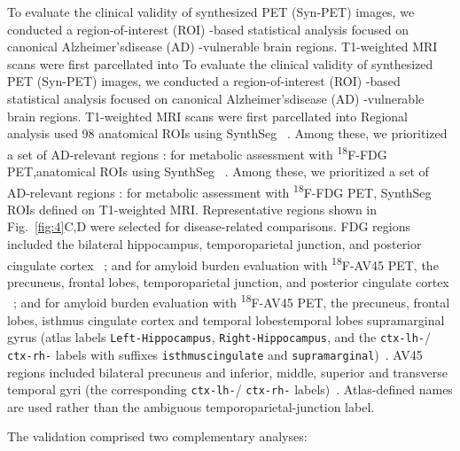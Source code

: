 \documentclass{article}
\providecommand{\DIFaddtex}[1]{{\protect\color{blue} \sf #1}} %
\providecommand{\DIFdeltex}[1]{{\protect\color{red} \ifmmode #1\else\scriptsize #1\fi}} %
\providecommand{\DIFaddbegin}{} %
\providecommand{\DIFaddend}{} %
\providecommand{\DIFdelbegin}{} %
\providecommand{\DIFdelend}{} %
\providecommand{\DIFadd}[1]{\texorpdfstring{\DIFaddtex{#1}}{#1}} %
\providecommand{\DIFdel}[1]{\texorpdfstring{\DIFdeltex{#1}}{}} %
\newcommand{\DIFscaledelfig}{0.5}
\newlength{\DIFdelgraphicswidth} %
\newlength{\DIFdelgraphicsheight} %
\newcommand{\DIFaddincludegraphics}[2][]{{\color{blue}\fbox{\DIFOincludegraphics[#1]{#2}}}} %
\newcommand{\DIFdelincludegraphics}[2][]{%
\sbox{\DIFdelgraphicsbox}{\DIFOincludegraphics[#1]{#2}}%
\settoboxwidth{\DIFdelgraphicswidth}{\DIFdelgraphicsbox} %
\settoboxtotalheight{\DIFdelgraphicsheight}{\DIFdelgraphicsbox} %
\scalebox{\DIFscaledelfig}{%
\parbox[b]{\DIFdelgraphicswidth}{\usebox{\DIFdelgraphicsbox}\\[-\baselineskip] \rule{\DIFdelgraphicswidth}{0em}}\llap{\resizebox{\DIFdelgraphicswidth}{\DIFdelgraphicsheight}{%
\setlength{\unitlength}{\DIFdelgraphicswidth}%
\begin{picture}(1,1)%
\thicklines\linethickness{2pt} %
{\color[rgb]{1,0,0}\put(0,0){\framebox(1,1){}}}%
{\color[rgb]{1,0,0}\put(0,0){\line( 1,1){1}}}%
{\color[rgb]{1,0,0}\put(0,1){\line(1,-1){1}}}%
\end{picture}%
}\hspace*{3pt}}} %
} %
\DeclareRobustCommand{\DIFaddbegin}{\DIFOaddbegin \let\includegraphics\DIFaddincludegraphics} %
\DeclareRobustCommand{\DIFaddend}{\DIFOaddend \let\includegraphics\DIFOincludegraphics} %
\DeclareRobustCommand{\DIFdelbegin}{\DIFOdelbegin \let\includegraphics\DIFdelincludegraphics} %
\DeclareRobustCommand{\DIFdelend}{\DIFOaddend \let\includegraphics\DIFOincludegraphics} %
\begin{document}
\DIFdelbegin \DIFdel{To evaluate the clinical validity of synthesized PET (Syn-PET) images, we conducted a region-of-interest (ROI) -based statistical analysis focused on canonical Alzheimer’sdisease (AD) -vulnerable brain regions. T1-weighted MRI scans were first parcellated into }\DIFdelend \DIFaddbegin \DIFadd{Regional analysis used }\DIFaddend 98 \DIFdelbegin \DIFdel{anatomical ROIs using SynthSeg ~\cite{synthseg}. Among these, we prioritized a set of AD-relevant regions : for metabolic assessment with \textsuperscript{18}F-FDG PET,}\DIFdelend \DIFaddbegin \DIFadd{SynthSeg ROIs defined on T1-weighted MRI. Representative regions shown in Fig.~\ref{fig:4}C,D were selected for disease-related comparisons. FDG regions included }\DIFaddend the bilateral hippocampus, \DIFdelbegin \DIFdel{temporoparietal junction, and posterior cingulate cortex ~\cite{mueller2005alzheimers}; and for amyloid burden evaluation with \textsuperscript{18}F-AV45 PET, the precuneus, frontal lobes, }\DIFdelend \DIFaddbegin \DIFadd{isthmus cingulate cortex }\DIFaddend and \DIFdelbegin \DIFdel{temporal lobes}\DIFdelend \DIFaddbegin \DIFadd{supramarginal gyrus (atlas labels \texttt{Left-Hippocampus}, \texttt{Right-Hippocampus}, and the \texttt{ctx-lh-}/}\allowbreak\DIFadd{\texttt{ctx-rh-} labels with suffixes \texttt{isthmuscingulate} and \texttt{supramarginal})~\cite{mosconi2005reduced,he2015meta,strom2022cortical}. AV45 regions included bilateral precuneus and inferior, middle, superior and transverse temporal gyri (the corresponding \texttt{ctx-lh-}/}\allowbreak\DIFadd{\texttt{ctx-rh-} labels)}\DIFaddend ~\cite{wong2010in}. \DIFaddbegin \DIFadd{Atlas-defined names are used rather than the ambiguous temporoparietal-junction label.
}\DIFaddend 

The validation comprised two complementary analyses:
\end{document}
